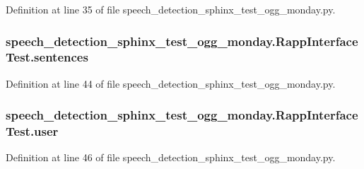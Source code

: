 Definition at line 35 of file speech\-\_\-detection\-\_\-sphinx\-\_\-test\-\_\-ogg\-\_\-monday.\-py.

\hypertarget{classspeech__detection__sphinx__test__ogg__monday_1_1RappInterfaceTest_a8b4f5349ba6a515aecfa9660da993609}{
\subsubsection[{sentences}]{\setlength{\rightskip}{0pt plus 5cm}speech\-\_\-detection\-\_\-sphinx\-\_\-test\-\_\-ogg\-\_\-monday.\-Rapp\-Interface\-Test.\-sentences}}\label{classspeech__detection__sphinx__test__ogg__monday_1_1RappInterfaceTest_a8b4f5349ba6a515aecfa9660da993609}


Definition at line 44 of file speech\-\_\-detection\-\_\-sphinx\-\_\-test\-\_\-ogg\-\_\-monday.\-py.

\hypertarget{classspeech__detection__sphinx__test__ogg__monday_1_1RappInterfaceTest_acce31c60cd02612817b66826206d4014}{
\subsubsection[{user}]{\setlength{\rightskip}{0pt plus 5cm}speech\-\_\-detection\-\_\-sphinx\-\_\-test\-\_\-ogg\-\_\-monday.\-Rapp\-Interface\-Test.\-user}}\label{classspeech__detection__sphinx__test__ogg__monday_1_1RappInterfaceTest_acce31c60cd02612817b66826206d4014}


Definition at line 46 of file speech\-\_\-detection\-\_\-sphinx\-\_\-test\-\_\-ogg\-\_\-monday.\-py.

